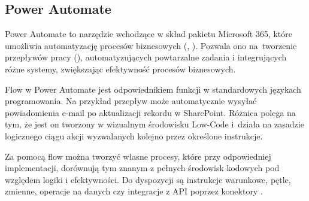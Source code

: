 \subsection{Power Automate }
Power Automate to narzędzie wchodzące w skład pakietu Microsoft 365, które umożliwia automatyzację procesów biznesowych (, ). Pozwala ono na~tworzenie przepływów pracy (), automatyzujących powtarzalne zadania i integrujących różne systemy, zwiększając efektywność procesów biznesowych.

Flow w Power Automate jest odpowiednikiem funkcji w standardowych językach programowania. Na przykład przepływ może automatycznie wysyłać powiadomienia e-mail po aktualizacji rekordu w SharePoint. Różnica polega na tym, że jest on tworzony w wizualnym środowisku Low-Code i~działa na zasadzie logicznego ciągu akcji wyzwalanych kolejno przez określone instrukcje.

Za pomocą flow można tworzyć własne procesy, które przy odpowiedniej implementacji, dorównują tym znanym z pełnych środowisk kodowych pod względem logiki i efektywności. Do dyspozycji są instrukcje warunkowe, pętle, zmienne, operacje na danych czy integracje z API poprzez konektory \texorpdfstring{\cite{v-aangie_official_nodate}}{}.
